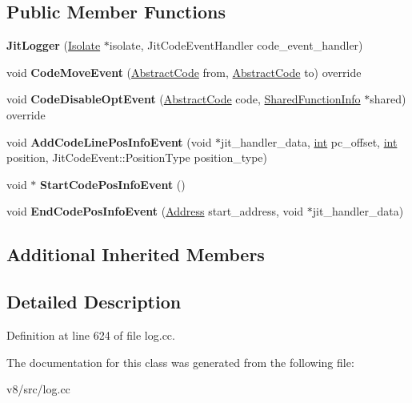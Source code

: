 \subsection*{Public Member Functions}
\begin{DoxyCompactItemize}
\item 
\mbox{\label{classv8_1_1internal_1_1JitLogger_a4887c963640eca28dc82db005861855c}} 
{\bfseries Jit\+Logger} (\mbox{\hyperlink{classv8_1_1internal_1_1Isolate}{Isolate}} $\ast$isolate, Jit\+Code\+Event\+Handler code\+\_\+event\+\_\+handler)
\item 
\mbox{\label{classv8_1_1internal_1_1JitLogger_a270a00b56bff5ed4a43e54ebb402de55}} 
void {\bfseries Code\+Move\+Event} (\mbox{\hyperlink{classv8_1_1internal_1_1AbstractCode}{Abstract\+Code}} from, \mbox{\hyperlink{classv8_1_1internal_1_1AbstractCode}{Abstract\+Code}} to) override
\item 
\mbox{\label{classv8_1_1internal_1_1JitLogger_adacbe7168d45f2490b98808c0e567c2d}} 
void {\bfseries Code\+Disable\+Opt\+Event} (\mbox{\hyperlink{classv8_1_1internal_1_1AbstractCode}{Abstract\+Code}} code, \mbox{\hyperlink{classv8_1_1internal_1_1SharedFunctionInfo}{Shared\+Function\+Info}} $\ast$shared) override
\item 
\mbox{\label{classv8_1_1internal_1_1JitLogger_af2076ae625c31e5165653dde71a30e49}} 
void {\bfseries Add\+Code\+Line\+Pos\+Info\+Event} (void $\ast$jit\+\_\+handler\+\_\+data, \mbox{\hyperlink{classint}{int}} pc\+\_\+offset, \mbox{\hyperlink{classint}{int}} position, Jit\+Code\+Event\+::\+Position\+Type position\+\_\+type)
\item 
\mbox{\label{classv8_1_1internal_1_1JitLogger_ae521e7d5d7de523dd5fd5a57b1f39907}} 
void $\ast$ {\bfseries Start\+Code\+Pos\+Info\+Event} ()
\item 
\mbox{\label{classv8_1_1internal_1_1JitLogger_a9504054c843f691b0626fa60e93ea8c4}} 
void {\bfseries End\+Code\+Pos\+Info\+Event} (\mbox{\hyperlink{classuintptr__t}{Address}} start\+\_\+address, void $\ast$jit\+\_\+handler\+\_\+data)
\end{DoxyCompactItemize}
\subsection*{Additional Inherited Members}


\subsection{Detailed Description}


Definition at line 624 of file log.\+cc.



The documentation for this class was generated from the following file\+:\begin{DoxyCompactItemize}
\item 
v8/src/log.\+cc\end{DoxyCompactItemize}
